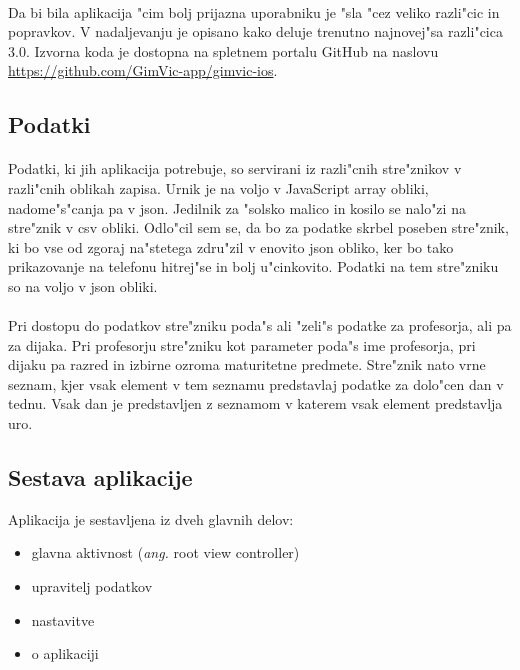 \paragraph{}Da bi bila aplikacija "cim bolj prijazna uporabniku je "sla "cez veliko razli"cic in popravkov. V nadaljevanju je opisano kako deluje trenutno najnovej"sa razli"cica 3.0. Izvorna koda je dostopna na spletnem portalu GitHub na naslovu \url{https://github.com/GimVic-app/gimvic-ios}.

\subsection{Podatki} 
\paragraph{}Podatki, ki jih aplikacija potrebuje, so servirani iz razli"cnih stre"znikov v razli"cnih oblikah zapisa. Urnik je na voljo v JavaScript array obliki, nadome"s"canja pa v json\cite{json-wiki}. Jedilnik za "solsko malico in kosilo se nalo"zi na stre"znik v csv obliki. Odlo"cil sem se, da bo za podatke skrbel poseben stre"znik, ki bo vse od zgoraj na"stetega zdru"zil v enovito json obliko, ker bo tako prikazovanje na telefonu hitrej"se in bolj u"cinkovito. Podatki na tem stre"zniku so na voljo v json obliki.

\paragraph{}Pri dostopu do podatkov stre"zniku poda"s ali "zeli"s podatke za profesorja, ali pa za dijaka. Pri profesorju stre"zniku kot parameter poda"s ime profesorja, pri dijaku pa razred in izbirne ozroma maturitetne predmete. Stre"znik nato vrne seznam, kjer vsak element v tem seznamu predstavlaj podatke za dolo"cen dan v tednu. Vsak dan je predstavljen z seznamom v katerem vsak element predstavlja uro.

\newpage
\subsection{Sestava aplikacije}
Aplikacija je sestavljena iz dveh glavnih delov:
\begin{itemize}
	\setlength\itemsep{0em}
	\item glavna aktivnost (\textit{ang.} root view controller)
	\item upravitelj podatkov
	\item nastavitve
	\item o aplikaciji
\end{itemize}

